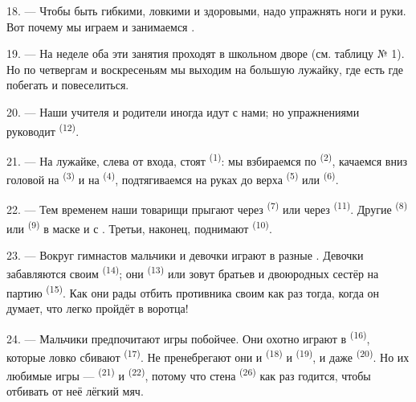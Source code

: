 18. --- Чтобы быть гибкими, ловкими и здоровыми, надо упражнять ноги и
руки. Вот почему мы играем и занимаемся .

19. --- На неделе оба эти занятия проходят в школьном дворе (см. таблицу
№ 1). Но по четвергам и воскресеньям мы выходим на большую лужайку, где
есть где побегать и повеселиться.

20. --- Наши учителя и родители иногда идут с нами; но упражнениями
руководит  \textsuperscript{(12)}.

21. --- На лужайке, слева от входа, стоят 
\textsuperscript{(1)}: мы взбираемся по  \textsuperscript{(2)},
качаемся вниз головой на  \textsuperscript{(3)} и на
 \textsuperscript{(4)}, подтягиваемся на руках до верха
 \textsuperscript{(5)} или 
\textsuperscript{(6)}.

22. --- Тем временем наши товарищи прыгают через 
\textsuperscript{(7)} или через  \textsuperscript{(11)}. Другие
 \textsuperscript{(8)} или  \textsuperscript{(9)} в
маске и с . Третьи, наконец, поднимают 
\textsuperscript{(10)}.

\VUsaut{4.6mm}
\VUsaut{3.0mm}

23. --- Вокруг гимнастов мальчики и девочки играют в разные .
Девочки забавляются своим  \textsuperscript{(14)}; они
 \textsuperscript{(13)} или зовут братьев и
двоюродных сестёр на партию  \textsuperscript{(15)}. Как они
рады отбить  противника своим  как
раз тогда, когда он думает, что легко пройдёт в воротца!

24. --- Мальчики предпочитают игры побойчее. Они охотно играют в
 \textsuperscript{(16)}, которые ловко сбивают 
\textsuperscript{(17)}. Не пренебрегают они и  \textsuperscript{(18)}
и  \textsuperscript{(19)}, и даже 
\textsuperscript{(20)}. Но их любимые игры ---  \textsuperscript{(21)}
и  \textsuperscript{(22)}, потому что стена
 \textsuperscript{(26)} как раз годится, чтобы отбивать от
неё лёгкий мяч.

